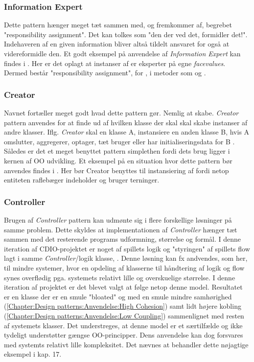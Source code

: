 \subsubsection{Information Expert}\label{Chapter:Design patterns:Anvendelse:Information Expert}
Dette pattern hænger meget tæt sammen med, og fremkommer af, begrebet "responsibility assignment". Det kan tolkes som "den der ved det, formidler det!". Indehaveren af en given information bliver altså tildelt ansvaret for også at videreformidle den. Et godt eksempel på anvendelse af \textit{Information Expert} kan findes i . Her er det oplagt at instanser af  er eksperter på egne \textit{facevalues}. Dermed består "responsibility assignment", for , i metoder som  og . 

\subsubsection{Creator}\label{Chapter:Design patterns:Anvendelse:Creator}
Navnet fortæller meget godt hvad dette pattern gør. Nemlig at skabe. \textit{Creator} pattern anvendes for at finde ud af hvilken klasse der skal skal skabe instanser af andre klasser. Iflg. \textit{Creator} skal en klasse A, instansiere en anden klasse B, hvis A omslutter, aggregerer, optager, tæt bruger eller har initialiseringsdata for B \cite{umlbook}. Således er det et meget benyttet pattern simplethen fordi dets brug ligger i kernen af OO udvikling. Et eksempel på en situation hvor dette pattern bør anvendes findes i . Her bør Creator benyttes til instansiering af  fordi netop entiteten raflebæger indeholder og bruger terninger. 

\subsubsection{Controller}\label{Chapter:Design patterns:Anvendelse:Controller}
Brugen af \textit{Controller} pattern kan udmønte sig i flere forskellige løsninger på samme problem. Dette skyldes at implementationen af \textit{Controller} hænger tæt sammen med det resterende programs udformning, størrelse og formål. I denne iteration af CDIO-projektet er noget af spillets logik og "styringen" af spillets flow lagt i samme \textit{Controller}/logik klasse, . Denne løsning kan fx andvendes, som her, til mindre systemer, hvor en opdeling af klasserne til håndtering af logik og flow synes overflødig pga. systemets relativt lille og overskuelige størrelse. I denne iteration af projektet er det blevet valgt at følge netop denne model. Resultatet er en klasse  der er en smule "bloated" og med en smule mindre samhørighed (\vref{Chapter:Design patterns:Anvendelse:High Cohesion}) samt lidt højere kobling (\vref{Chapter:Design patterns:Anvendelse:Low Coupling}) sammenlignet med resten af systemets klasser. Det understreges, at denne model er et særtilfælde og ikke tydeligt understøtter gængse OO-principper. Dens anvendelse kan dog forsvares med systemts relativt lille kompleksitet. Det nævnes at \cite{umlbook} behandler dette nøjagtige eksempel i kap. 17.

